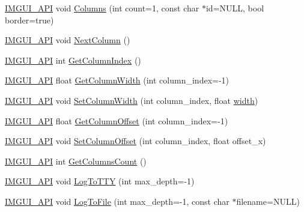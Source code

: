\begin{DoxyCompactItemize}
\item 
\mbox{\hyperlink{imgui_8h_a43829975e84e45d1149597467a14bbf5}{I\+M\+G\+U\+I\+\_\+\+A\+PI}} void \mbox{\hyperlink{namespace_im_gui_a0e2889956542527c4039b6b8bf5c2a38}{Columns}} (int count=1, const char $\ast$id=N\+U\+LL, bool border=true)
\item 
\mbox{\hyperlink{imgui_8h_a43829975e84e45d1149597467a14bbf5}{I\+M\+G\+U\+I\+\_\+\+A\+PI}} void \mbox{\hyperlink{namespace_im_gui_a8f97746d6a9d59c8400c26fb7613a2ff}{Next\+Column}} ()
\item 
\mbox{\hyperlink{imgui_8h_a43829975e84e45d1149597467a14bbf5}{I\+M\+G\+U\+I\+\_\+\+A\+PI}} int \mbox{\hyperlink{namespace_im_gui_acc31f8eea4fcfb86edeb3ac12d82fc05}{Get\+Column\+Index}} ()
\item 
\mbox{\hyperlink{imgui_8h_a43829975e84e45d1149597467a14bbf5}{I\+M\+G\+U\+I\+\_\+\+A\+PI}} float \mbox{\hyperlink{namespace_im_gui_a3d205d86dab5ca0763a92997283ac36e}{Get\+Column\+Width}} (int column\+\_\+index=-\/1)
\item 
\mbox{\hyperlink{imgui_8h_a43829975e84e45d1149597467a14bbf5}{I\+M\+G\+U\+I\+\_\+\+A\+PI}} void \mbox{\hyperlink{namespace_im_gui_af17222ec47aebb5ede00be7b52de9f5d}{Set\+Column\+Width}} (int column\+\_\+index, float \mbox{\hyperlink{graphics_8cpp_a2474a5474cbff19523a51eb1de01cda4}{width}})
\item 
\mbox{\hyperlink{imgui_8h_a43829975e84e45d1149597467a14bbf5}{I\+M\+G\+U\+I\+\_\+\+A\+PI}} float \mbox{\hyperlink{namespace_im_gui_a79c22e9c5c208b6c9534a273be71a9e6}{Get\+Column\+Offset}} (int column\+\_\+index=-\/1)
\item 
\mbox{\hyperlink{imgui_8h_a43829975e84e45d1149597467a14bbf5}{I\+M\+G\+U\+I\+\_\+\+A\+PI}} void \mbox{\hyperlink{namespace_im_gui_a8cc207211d6cf3f77b505e24aed4ebcc}{Set\+Column\+Offset}} (int column\+\_\+index, float offset\+\_\+x)
\item 
\mbox{\hyperlink{imgui_8h_a43829975e84e45d1149597467a14bbf5}{I\+M\+G\+U\+I\+\_\+\+A\+PI}} int \mbox{\hyperlink{namespace_im_gui_a3c2998ad9527948a4e4166c4f7db9ec9}{Get\+Columns\+Count}} ()
\item 
\mbox{\hyperlink{imgui_8h_a43829975e84e45d1149597467a14bbf5}{I\+M\+G\+U\+I\+\_\+\+A\+PI}} void \mbox{\hyperlink{namespace_im_gui_a37696f5296f33ae4218f53b40b81cccc}{Log\+To\+T\+TY}} (int max\+\_\+depth=-\/1)
\item 
\mbox{\hyperlink{imgui_8h_a43829975e84e45d1149597467a14bbf5}{I\+M\+G\+U\+I\+\_\+\+A\+PI}} void \mbox{\hyperlink{namespace_im_gui_ab62461a65c153b9f40842debef8aa755}{Log\+To\+File}} (int max\+\_\+depth=-\/1, const char $\ast$filename=N\+U\+LL)

\end{DoxyCompactItemize}
